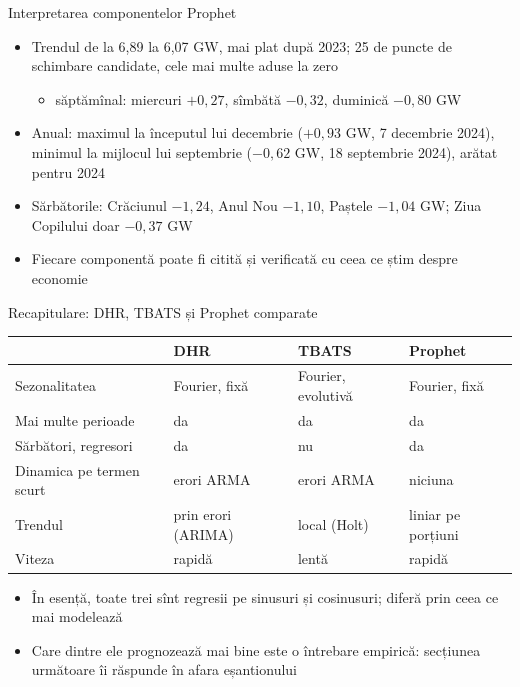 \begin{frame}{Interpretarea componentelor Prophet}
\itemsize{\small}
\begin{itemize}
    \item Trendul de la 6{,}89 la 6{,}07 GW, mai plat după 2023; 25 de puncte de schimbare candidate, cele mai multe aduse la zero
    \begin{itemize}
        \item săptămînal: miercuri $+0{,}27$, sîmbătă $\ensuremath{-}0{,}32$, duminică $\ensuremath{-}0{,}80$ GW
    \end{itemize}
    \item Anual: maximul la începutul lui decembrie ($+0{,}93$ GW, 7 decembrie 2024), minimul la mijlocul lui septembrie ($\ensuremath{-}0{,}62$ GW, 18 septembrie 2024), arătat pentru 2024
    \item Sărbătorile: Crăciunul $\ensuremath{-}1{,}24$, Anul Nou $\ensuremath{-}1{,}10$, Paștele $\ensuremath{-}1{,}04$ GW; Ziua Copilului doar $\ensuremath{-}0{,}37$ GW
    \item Fiecare componentă poate fi citită și verificată cu ceea ce știm despre economie
\end{itemize}
\end{frame}

\begin{frame}{Recapitulare: DHR, TBATS și Prophet comparate}
\itemsize{\footnotesize}
\begin{center}
\scriptsize
\begin{tabular}{>{\raggedright\arraybackslash}p{2.6cm}>{\raggedright\arraybackslash}p{2.8cm}>{\raggedright\arraybackslash}p{2.8cm}>{\raggedright\arraybackslash}p{2.8cm}}
\toprule
 & \textbf{DHR} & \textbf{TBATS} & \textbf{Prophet} \\
\midrule
Sezonalitatea & Fourier, fixă & Fourier, evolutivă & Fourier, fixă \\
Mai multe perioade & da & da & da \\
Sărbători, regresori & da & nu & da \\
Dinamica pe termen scurt & erori ARMA & erori ARMA & niciuna \\
Trendul & prin erori (ARIMA) & local (Holt) & liniar pe porțiuni \\
Viteza & rapidă & lentă & rapidă \\
\bottomrule
\end{tabular}
\end{center}
\begin{itemize}
    \item În esență, toate trei sînt regresii pe sinusuri și cosinusuri; diferă prin ceea ce mai modelează
    \item Care dintre ele prognozează mai bine este o întrebare empirică: secțiunea următoare îi răspunde în afara eșantionului
\end{itemize}
\end{frame}


